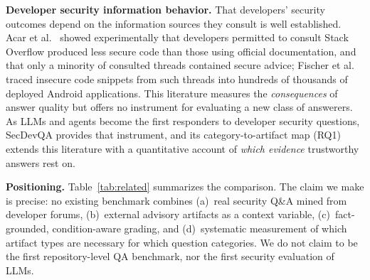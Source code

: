 \noindent\textbf{Developer security information behavior.}
That developers' security outcomes depend on the information sources they
consult is well established. Acar et al.~\cite{acar2016information} showed
experimentally that developers permitted to consult Stack Overflow produced
less secure code than those using official documentation, and that only a
minority of consulted threads contained secure advice; Fischer et
al.~\cite{fischer2017stackoverflow} traced insecure code snippets from such
threads into hundreds of thousands of deployed Android applications. This
literature measures the \emph{consequences} of answer quality but offers no
instrument for evaluating a new class of answerers. As LLMs and agents become
the first responders to developer security questions, SecDevQA provides that
instrument, and its category-to-artifact map (RQ1) extends this literature with
a quantitative account of \emph{which evidence} trustworthy answers rest on.

\noindent\textbf{Positioning.}
Table~\ref{tab:related} summarizes the comparison. The claim we make is
precise: no existing benchmark combines (a)~real security Q\&A mined from
developer forums, (b)~external advisory artifacts as a context variable,
(c)~fact-grounded, condition-aware grading, and (d)~systematic measurement of
which artifact types are necessary for which question categories. We do not
claim to be the first repository-level QA benchmark, nor the first security
evaluation of LLMs.


